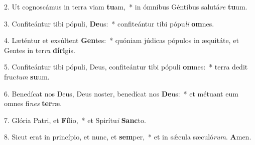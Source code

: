 2. Ut cognoscámus in terra viam \textbf{tu}am,~*  in ómnibus Géntibus salutá\textit{re} \textbf{tu}um.\

3. Confiteántur tibi pópuli, \textbf{De}us:~*  confiteántur tibi pópu\textit{li} \textbf{om}nes.\

4. Læténtur et exsúltent \textbf{Gen}tes:~*  quóniam júdicas pópulos in æquitáte, et Gentes in ter\textit{ra} \textbf{dí}\textbf{ri}gis.\

5. Confiteántur tibi pópuli, Deus, confiteántur tibi pópuli \textbf{om}nes:~*  terra dedit fruc\textit{tum} \textbf{su}um.\

6. Benedícat nos Deus, Deus noster, benedícat nos \textbf{De}us:~*  et métuant eum omnes fi\textit{nes} \textbf{ter}ræ.\

7. Glória Patri, et \textbf{Fí}lio,~*  et Spirítu\textit{i} \textbf{Sanc}to.\

8. Sicut erat in princípio, et nunc, et \textbf{sem}per,~*  et in sǽcula sæculó\textit{rum}. \textbf{A}men.\


